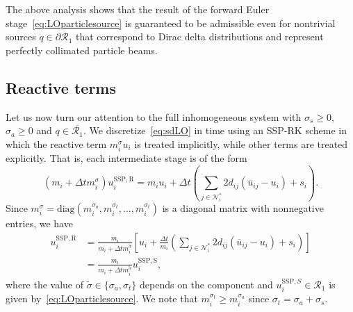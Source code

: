 \documentclass[preprint, 11pt]{elsarticle}
\newcommand{\N}{\mathcal{N}}
\begin{document}
\begin{remark}
    The above analysis shows that the result of the forward Euler stage~\eqref{eq:LOparticlesource} is guaranteed to be admissible even for nontrivial sources $q\in\partial\mathcal{R}_1$ that correspond to Dirac delta distributions and represent perfectly collimated particle beams.
\end{remark}


\subsection{Reactive terms}
Let us now turn our attention to the full inhomogeneous system with $\sigma_s\geq 0$, $\sigma_a \geq 0$ and $q\in\overline{\mathcal{R}_1}$. We discretize~\eqref{eq:sdLO} in time using an SSP-RK scheme in which the reactive term $m_i^{\sigma}u_i$ is treated implicitly, while other terms are treated explicitly. That is, each intermediate stage is of the form
\begin{equation*}
    \left(m_i +\Delta t m_i^{\sigma}\right) u_i^{\mathrm{SSP,R}} = m_i u_i + \Delta t\left(\sum_{j\in\N_i^*}2d_{ij} (\overline{u}_{ij} -u_i) + s_i\right).
\end{equation*}
Since $m_i^\sigma = \mathrm{diag}(m_i^{\sigma_a}, m_i^{\sigma_t},\ldots, m_i^{\sigma_t})$ is a diagonal matrix with nonnegative entries, we have
\begin{equation}\label{eq:fullLO}
\begin{split}
    u_i^{\mathrm{SSP,R}} &= \frac{m_i}{m_i + \Delta t m_i^{\tilde\sigma}}\left[ u_i + \frac{\Delta t}{m_i}\left(\sum_{j\in\N_i^*}2d_{ij} (\overline{u}_{ij} -u_i) + s_i\right)\right]\\
    &= \frac{m_i}{m_i + \Delta t m_i^{\tilde\sigma}} u_i^{\mathrm{SSP}, \mathrm{S}},
\end{split}
\end{equation}
where the value of $\tilde\sigma\in\{\sigma_a,\sigma_t\}$ depends on the component and $u_i^{\mathrm{SSP}, S}\in\mathcal{R}_1$ is given by~\eqref{eq:LOparticlesource}. 
We note that $m_i^{\sigma_t} \geq m_i^{\sigma_a}$ since $\sigma_t = \sigma_a +\sigma_s$.
\end{document}
